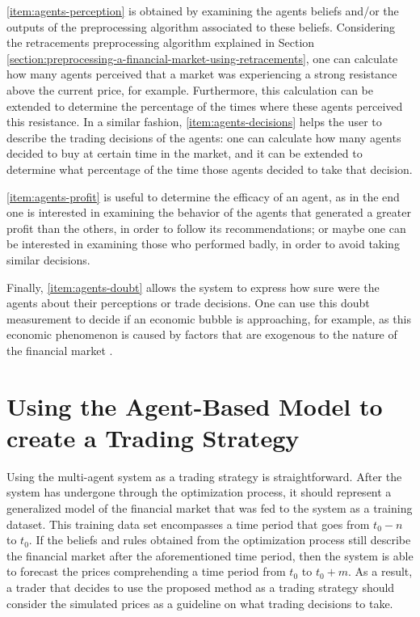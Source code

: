 \ref{item:agents-perception} is obtained by examining the agents beliefs and/or
the outputs of the preprocessing algorithm associated to these
beliefs. Considering the retracements preprocessing algorithm explained in
Section \ref{section:preprocessing-a-financial-market-using-retracements}, one
can calculate how many agents perceived that a market was experiencing a strong
resistance above the current price, for example. Furthermore, this calculation
can be extended to determine the percentage of the times where these agents
perceived this resistance. In a similar fashion, \ref{item:agents-decisions}
helps the user to describe the trading decisions of the agents: one can
calculate how many agents decided to buy at certain time in the market, and it
can be extended to determine what percentage of the time those agents decided to
take that decision.

\ref{item:agents-profit} is useful to determine the efficacy of an agent, as in
the end one is interested in examining the behavior of the agents that generated
a greater profit than the others, in order to follow its recommendations; or
maybe one can be interested in examining those who performed badly, in order to
avoid taking similar decisions.

Finally, \ref{item:agents-doubt} allows the system to express how sure were the
agents about their perceptions or trade decisions. One can use this doubt
measurement to decide if an economic bubble is approaching, for example, as this
economic phenomenon is caused by factors that are exogenous to the nature of the
financial market \cite{Martin2011}.

\section{Using the Agent-Based Model to create a Trading Strategy}
\label{section:using-the-agent-based-model-to-create-a-trading-strategy}

Using the multi-agent system as a trading strategy is straightforward. After the
system has undergone through the optimization process, it should represent a
generalized model of the financial market that was fed to the system as a
training dataset. This training data set encompasses a time period that goes
from $t_0-n$ to $t_0$. If the beliefs and rules obtained from the optimization
process still describe the financial market after the aforementioned time
period, then the system is able to forecast the prices comprehending a time
period from $t_0$ to $t_0+m$. As a result, a trader that decides to use the
proposed method as a trading strategy should consider the simulated prices as a
guideline on what trading decisions to take.
